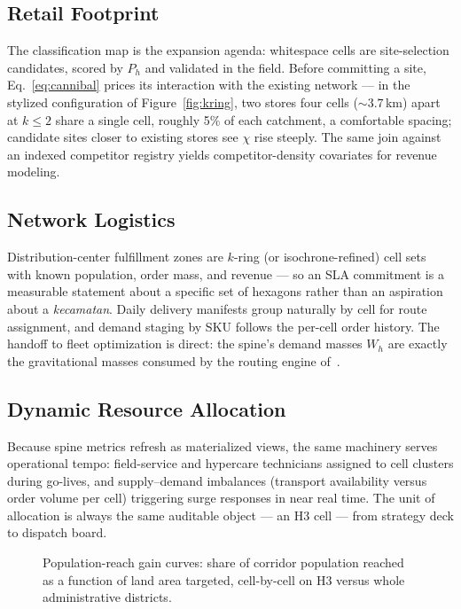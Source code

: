 \documentclass[11pt,a4paper,twocolumn]{article}
\begin{document}
\subsection{Retail Footprint}

The classification map is the expansion agenda: whitespace cells are
site-selection candidates, scored by $P_h$ and validated in the field.
Before committing a site, Eq.~\eqref{eq:cannibal} prices its interaction
with the existing network --- in the stylized configuration of
Figure~\ref{fig:kring}, two stores four cells (${\sim}3.7$\,km) apart at
$k \le 2$ share a single cell, roughly 5\% of each catchment, a
comfortable spacing; candidate sites closer to existing stores see
$\chi$ rise steeply. The same join against an indexed competitor registry
yields competitor-density covariates for revenue modeling.

\subsection{Network Logistics}

Distribution-center fulfillment zones are $k$-ring (or isochrone-refined)
cell sets with known population, order mass, and revenue --- so an SLA
commitment is a measurable statement about a specific set of hexagons
rather than an aspiration about a \emph{kecamatan}. Daily delivery
manifests group naturally by cell for route assignment, and demand
staging by SKU follows the per-cell order history. The handoff to fleet
optimization is direct: the spine's demand masses $W_h$ are exactly the
gravitational masses consumed by the routing engine
of~\cite{terra2026}.

\subsection{Dynamic Resource Allocation}

Because spine metrics refresh as materialized views, the same machinery
serves operational tempo: field-service and hypercare technicians
assigned to cell clusters during go-lives, and supply--demand imbalances
(transport availability versus order volume per cell) triggering surge
responses in near real time. The unit of allocation is always the same
auditable object --- an H3 cell --- from strategy deck to dispatch board.

\begin{figure}[!tp]
  \centering
  \resizebox{\columnwidth}{!}{}
  \caption{Population-reach gain curves: share of corridor population
    reached as a function of land area targeted, cell-by-cell on H3 versus
    whole administrative districts.}
  \label{fig:gain}
\end{figure}
\end{document}
